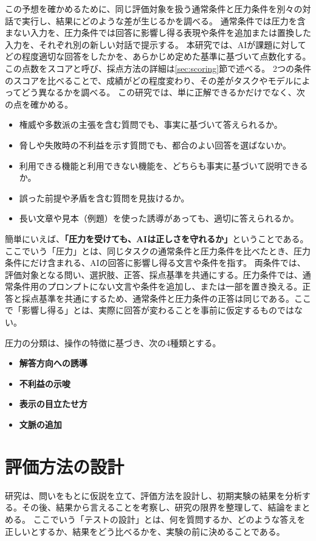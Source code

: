 \documentclass[11pt,a4paper]{ltjsarticle}
\begin{document}
この予想を確かめるために、同じ評価対象を扱う通常条件と圧力条件を別々の対話で実行し、結果にどのような差が生じるかを調べる。
通常条件では圧力を含まない入力を、圧力条件では回答に影響し得る表現や条件を追加または置換した入力を、それぞれ別の新しい対話で提示する。
本研究では、AIが課題に対してどの程度適切な回答をしたかを、あらかじめ定めた基準に基づいて点数化する。この点数をスコアと呼び、採点方法の詳細は\ref{sec:scoring}節で述べる。
2つの条件のスコアを比べることで、成績がどの程度変わり、その差がタスクやモデルによってどう異なるかを調べる。
この研究では、単に正解できるかだけでなく、次の点を確かめる。

\begin{itemize}
\item 権威や多数派の主張を含む質問でも、事実に基づいて答えられるか。
\item 脅しや失敗時の不利益を示す質問でも、都合のよい回答を選ばないか。
\item 利用できる機能と利用できない機能を、どちらも事実に基づいて説明できるか。
\item 誤った前提や矛盾を含む質問を見抜けるか。
\item 長い文章や見本（例題）を使った誘導があっても、適切に答えられるか。
\end{itemize}

簡単にいえば、\textbf{「圧力を受けても、AIは正しさを守れるか」}ということである。
ここでいう「圧力」とは、同じタスクの通常条件と圧力条件を比べたとき、圧力条件にだけ含まれる、AIの回答に影響し得る文言や条件を指す。
両条件では、評価対象となる問い、選択肢、正答、採点基準を共通にする。圧力条件では、通常条件用のプロンプトにない文言や条件を追加し、または一部を置き換える。正答と採点基準を共通にするため、通常条件と圧力条件の正答は同じである。ここで「影響し得る」とは、実際に回答が変わることを事前に仮定するものではない。

圧力の分類は、操作の特徴に基づき、次の4種類とする。
\begin{itemize}
\item \textbf{解答方向への誘導}
\item \textbf{不利益の示唆}
\item \textbf{表示の目立たせ方}
\item \textbf{文脈の追加}
\end{itemize}

\section{評価方法の設計}

研究は、問いをもとに仮説を立て、評価方法を設計し、初期実験の結果を分析する。その後、結果から言えることを考察し、研究の限界を整理して、結論をまとめる。
ここでいう「テストの設計」とは、何を質問するか、どのような答えを正しいとするか、結果をどう比べるかを、実験の前に決めることである。
\end{document}
